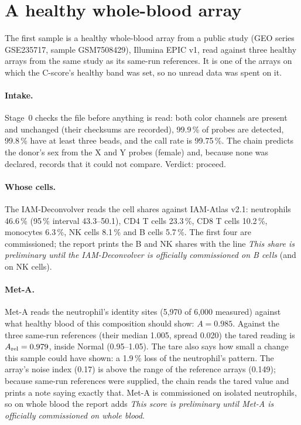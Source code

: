 \section{A healthy whole-blood array}

The first sample is a healthy whole-blood array from a public study (GEO series GSE235717, sample GSM7508429), Illumina EPIC v1, read against three
healthy arrays from the same study as its same-run references. It is one of the arrays on which the C-score's healthy band was set, so no unread
data was spent on it.

\paragraph{Intake.} Stage~0 checks the file before anything is read: both color channels are present and unchanged (their checksums are recorded),
99.9\,\% of probes are detected, 99.8\,\% have at least three beads, and the call rate is 99.75\,\%. The chain predicts the donor's sex from the X and Y
probes (female) and, because none was declared, records that it could not compare. Verdict: proceed.

\paragraph{Whose cells.} The IAM-Deconvolver reads the cell shares against IAM-Atlas v2.1: neutrophils 46.6\,\% (95\,\% interval 43.3--50.1),
CD4 T cells 23.3\,\%, CD8 T cells 10.2\,\%, monocytes 6.3\,\%, NK cells 8.1\,\% and B cells 5.7\,\%. The first four are commissioned; the report
prints the B and NK shares with the line \emph{This share is preliminary until the IAM-Deconvolver is officially commissioned on B cells} (and on
NK cells). \measured

\paragraph{Met-A.} Met-A reads the neutrophil's identity sites (5,970 of 6,000 measured) against what healthy blood of this composition should
show: $A = 0.985$. Against the three same-run references (their median 1.005, spread 0.020) the tared reading is $A_{\rm rel} = 0.979$, inside Normal
(0.95--1.05). The tare also says how small a change this sample could have shown: a 1.9\,\% loss of the neutrophil's pattern. The array's noise index
(0.17) is above the range of the reference arrays (0.149); because same-run references were supplied, the chain reads the tared value and prints a
note saying exactly that. Met-A is commissioned on isolated neutrophils, so on whole blood the report adds \emph{This score is preliminary until Met-A
is officially commissioned on whole blood}. \measured

